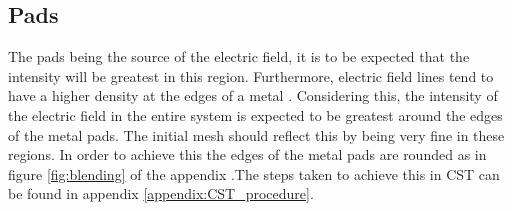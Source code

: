 \subsection{Pads}
The pads being the source of the electric field, it is to be expected that the intensity will be greatest in this region. Furthermore, electric field lines tend to have a higher density at the edges of a metal . Considering this, the intensity of the electric field in the entire system is expected to be greatest around the edges of the metal pads. The initial mesh should reflect this by being very fine in these regions. In order to achieve this the edges of the metal pads are rounded as in figure \ref{fig:blending} of the appendix .The steps taken to achieve this in CST can be found in appendix \ref{appendix:CST_procedure}. 